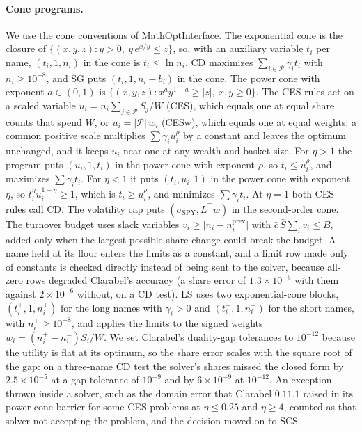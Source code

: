 \paragraph{Cone programs.}
We use the cone conventions of MathOptInterface. The exponential cone is the closure of
$\{(x, y, z) : y > 0,\ y\, e^{x/y} \le z\}$, so, with an auxiliary variable $t_i$ per name, $(t_i, 1, n_i)$ in the
cone is $t_i \le \ln n_i$. CD maximizes
$\sum_{i \in \mathcal{P}} \gamma_i t_i$ with $n_i \ge 10^{-8}$, and SG puts $(t_i, 1, n_i - b_i)$ in the cone. The
power cone with exponent $a \in (0, 1)$ is $\{(x, y, z) : x^{a} y^{1-a} \ge \lvert z \rvert,\ x, y \ge 0\}$. The CES
rules act on a scaled variable $u_i = n_i \sum_{j \in \mathcal{P}} S_j / W$ (CES), which equals one at equal share
counts that spend $W$, or $u_i = \lvert\mathcal{P}\rvert\, w_i$ (CESw), which equals one at equal weights; a common
positive scale multiplies $\sum \gamma_i u_i^{\rho}$ by a constant and leaves the optimum unchanged, and it keeps
$u_i$ near one at any wealth and basket size. For $\eta > 1$ the program puts $(u_i, 1, t_i)$ in the power cone with
exponent $\rho$, so $t_i \le u_i^{\rho}$, and maximizes $\sum \gamma_i t_i$. For $\eta < 1$ it puts $(t_i, u_i, 1)$ in
the power cone with exponent $\eta$, so $t_i^{\eta} u_i^{1-\eta} \ge 1$, which is $t_i \ge u_i^{\rho}$, and minimizes
$\sum \gamma_i t_i$. At $\eta = 1$ both CES rules call CD. The volatility cap puts
$(\sigma_{\mathrm{SPY}}, L^{\top} w)$ in the second-order cone. The turnover budget uses slack variables
$v_i \ge \lvert n_i - n_i^{\mathrm{prev}} \rvert$ with $\bar c\, \bar S \sum_i v_i \le B$, added only when the largest
possible share change could break the budget. A name held at its floor enters the limits as a constant, and a limit
row made only of constants is checked directly instead of being sent to the solver, because all-zero rows degraded
Clarabel's accuracy (a share error of $1.3 \times 10^{-5}$ with them against $2 \times 10^{-6}$ without, on a CD
test). LS uses two exponential-cone blocks, $(t_i^{+}, 1, n_i^{+})$ for the long names with $\gamma_i > 0$ and
$(t_i^{-}, 1, n_i^{-})$ for the short names, with $n_i^{\pm} \ge 10^{-8}$, and applies the limits to the signed
weights $w_i = (n_i^{+} - n_i^{-}) S_i / W$. We set Clarabel's duality-gap tolerances to $10^{-12}$ because the
utility is flat at its optimum, so the share error scales with the square root of the gap: on a three-name CD test the
solver's shares missed the closed form by $2.5 \times 10^{-5}$ at a gap tolerance of $10^{-9}$ and by
$6 \times 10^{-9}$ at $10^{-12}$. An exception thrown inside a solver, such as the domain error that Clarabel
$0.11.1$ raised in its power-cone barrier for some CES problems at $\eta \le 0.25$ and $\eta \ge 4$, counted as that
solver not accepting the problem, and the decision moved on to SCS.


